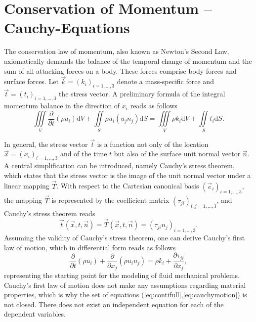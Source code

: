 \section{Conservation of Momentum -- Cauchy-Equations}

The conservation law of momentum, also known as Newton's Second Law, axiomatically demands the balance of the temporal change of momentum and the sum of all attacking forces on a body. These forces comprise body forces and surface forces. Let \(\vec{k} = \left( k_i \right)_{i=1,\dots,3}\) denote a mass-specific force and \(\vec{t} = \left(t_i\right)_{i=1,\dots,3}\) the stress vector. A preliminary formula of the integral momentum balance in the direction of \(x_i\) reads as follows
\begin{equation}
\label{eq:cauchy}
\iiint\limits_V \frac{\partial }{\partial t}\left(\rho u_i \right) \mathrm{d}V + \iint\limits_S \rho u_i \left( u_j n_j \right) \mathrm{d}S = \iiint\limits_V \rho k_i \mathrm{d}V + \iint\limits_S t_i \mathrm{d}S.
\end{equation}

In general, the stress vector \(\vec{t}\) is a function not only of the location \(\vec{x} = \left( x_i \right)_{i = 1,\dots,3}\) and of the time \(t\) but also of the surface unit normal vector \(\vec{n}\). A central simplification can be introduced, namely Cauchy's stress theorem, which states that the stress vector is the image of the unit normal vector under a linear mapping \(\vec{T}\). With respect to the Cartesian canonical basis \(\left(\vec{e}_i \right)_{i = 1, \dots, 3}\), the mapping \(\vec{T}\) is represented by the coefficient matrix \( \left(\tau_{ji}\right)_{i,j = 1,\dots,3}\), and Cauchy's stress theorem reads
\begin{displaymath}
  \vec{t}\left(\vec{x},t,\vec{n}\right) = \vec{T}(\vec{x},t,\vec{n}) = \left(\tau_{ji} n_j\right)_{i = 1, \dots, 3}.
\end{displaymath}
Assuming the validity of Cauchy's stress theorem, one can derive Cauchy's first law of motion, which in differential form reads as follows
\begin{equation}
  \label{eq:cauchymotion}
  \frac{\partial }{\partial t} \left(\rho u_i \right)
  + \frac{\partial}{\partial x_j}\left( \rho u_i u_j \right) 
  = \rho k_i + \frac{\partial \tau_{ji}}{\partial x_j},
\end{equation}
representing the starting point for the modeling of fluid mechanical problems. Cauchy's first law of motion does not make any assumptions regarding material properties, which is why the set of equations (\ref{eq:contifull},\ref{eq:cauchymotion}) is not closed. There does not exist an independent equation for each of the dependent variables.

